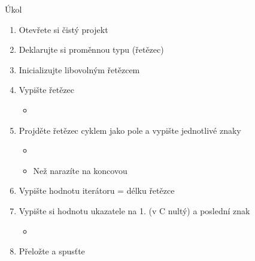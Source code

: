 \begin{frame}{Úkol}

  \begin{enumerate}
    \item Otevřete si čistý projekt 
    \item Deklarujte si proměnnou typu  (řetězec)
    \item Inicializujte libovolným řetězcem

    \item Vypište řetězec
    \begin{itemize}
      \item {}
    \end{itemize}

    \item Projděte řetězec cyklem jako pole a vypište jednotlivé znaky
    \begin{itemize}
      \item {}
      \item Než narazíte na koncovou 
    \end{itemize}

    \item Vypište hodnotu iterátoru = délku řetězce

    \item Vypište si hodnotu ukazatele na 1. (v C nultý) a poslední znak
    \begin{itemize}
      \item {}
    \end{itemize}

    \item Přeložte a spusťte
  \end{enumerate}

\end{frame}

